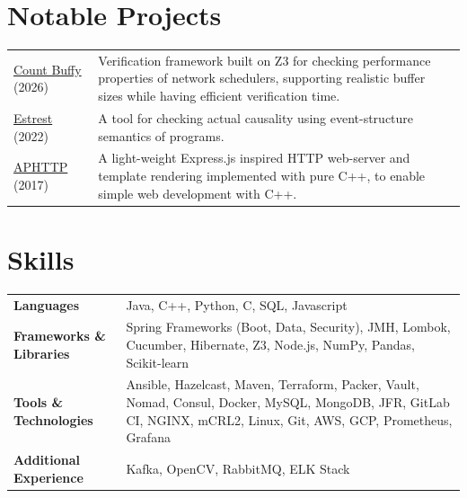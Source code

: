 \documentclass[a4paper,12pt]{article}
\begin{document}
    \section{Notable Projects}


    \begin{tabularx}{\linewidth}{ @{}l X@{} }
        \href{https://github.com/all-things-networking/count-buffy}{Count Buffy} (2026) & Verification framework built on Z3 for checking performance properties of network schedulers, supporting realistic buffer sizes while having efficient verification time.\\
        \href{https://github.com/seyhani/Estrest}{Estrest} (2022) & A tool for checking actual causality using event-structure semantics of programs.\\
        \href{https://github.com/UTAP/APHTTP}{APHTTP} (2017) & A light-weight Express.js inspired HTTP web-server and template rendering implemented with pure C++, to enable simple web development with C++. \\
    \end{tabularx}

    \section{Skills}
    \begin{tabularx}{\linewidth}{@{}l X@{}}
        \textbf{Languages} & Java, C++, Python, C, SQL, Javascript \\
        \textbf{Frameworks \& Libraries} & Spring Frameworks (Boot, Data, Security), JMH, Lombok, Cucumber, Hibernate, Z3, Node.js, NumPy, Pandas, Scikit-learn \\
        \textbf{Tools \& Technologies} & Ansible, Hazelcast, Maven, Terraform, Packer, Vault, Nomad, Consul, Docker, MySQL, MongoDB, JFR, GitLab CI, NGINX, mCRL2, Linux, Git, AWS, GCP, Prometheus, Grafana \\
        \textbf{Additional Experience} & Kafka, OpenCV, RabbitMQ, ELK Stack \\
    \end{tabularx}
    \vspace{10pt}
    \enlargethispage{20pt}
\end{document}
